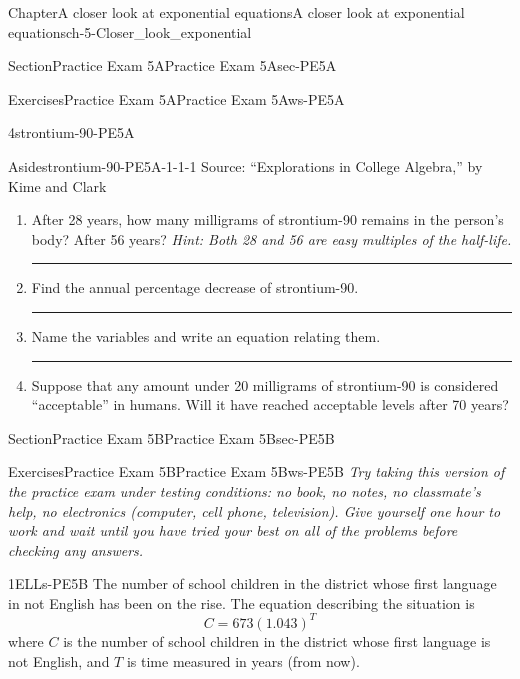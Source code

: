 \documentclass[twoside,11pt,]{book}
\newlength{\workspacestrutwidth}
\numberwithin{equation}{section}
\begin{document}
\begin{chapterptx}{Chapter}{A closer look at exponential equations}{}{A closer look at exponential equations}{}{}{ch-5-Closer_look_exponential}
\begin{sectionptx}{Section}{Practice Exam 5A}{}{Practice Exam 5A}{}{}{sec-PE5A}
\begin{exercises-subsection-numberless}{Exercises}{Practice Exam 5A}{}{Practice Exam 5A}{}{}{ws-PE5A}
\begin{divisionexercise}{4}{}{}{strontium-90-PE5A}
\begin{aside}{Aside}{}{strontium-90-PE5A-1-1-1}
Source: ``Explorations in College Algebra,'' by Kime and Clark%
\end{aside}
%
\begin{enumerate}[label=(\alph*),ref=\alph*]%
\item{}After 28 years, how many milligrams of strontium-90 remains in the person's body? After 56 years? \emph{Hint: Both 28 and 56 are easy multiples of the half-life.}%
\par\rule{\workspacestrutwidth}{0.75in}%
\item{}Find the annual percentage decrease of strontium-90.%
\par\rule{\workspacestrutwidth}{1.5in}%
\item{}Name the variables and write an equation relating them.%
\par\rule{\workspacestrutwidth}{1.5in}%
\item{}Suppose that any amount under 20 milligrams of strontium-90 is considered ``acceptable'' in humans. Will it have reached acceptable levels after 70 years?%
\end{enumerate}%
\end{divisionexercise}%
\end{exercises-subsection-numberless}
\end{sectionptx}
%
%
\typeout{************************************************}
\typeout{************************************************}
%
\begin{sectionptx}{Section}{Practice Exam 5B}{}{Practice Exam 5B}{}{}{sec-PE5B}
%
%
\typeout{************************************************}
\typeout{************************************************}
%
\begin{exercises-subsection-numberless}{Exercises}{Practice Exam 5B}{}{Practice Exam 5B}{}{}{ws-PE5B}
\emph{Try taking this version of the practice exam under testing conditions: no book, no notes, no classmate's help, no electronics (computer, cell phone, television). Give yourself one hour to work and wait until you have tried your best on all of the problems before checking any answers.}%
 \begin{divisionexercise}{1}{}{}{ELLs-PE5B}%
The number of school children in the district whose first language in not English has been on the rise. The equation describing the situation is%
\begin{equation*}
C=673(1.043)^T
\end{equation*}
where \(C\) is the number of school children in the district whose first language is not English, and \(T\) is time measured in years (from now).%

\end{divisionexercise}
\end{exercises-subsection-numberless}
\end{sectionptx}
\end{chapterptx}
\end{document}

